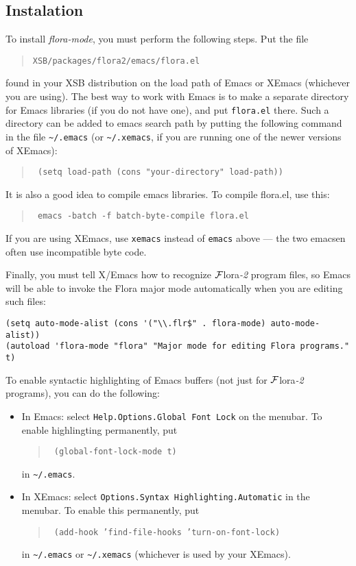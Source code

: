 \documentclass[11pt]{article}
\newcommand{\FLORA}{{\mbox{${\cal F}${\sc lora}\rm\emph{-2}}}\xspace}
\begin{document}
\subsection{Instalation}


To install \emph{flora-mode}, you must perform the following steps. Put the
file
\begin{quote}
  {\tt XSB/packages/flora2/emacs/flora.el} 
\end{quote}
found in your XSB distribution on the load path of Emacs or XEmacs
(whichever you are using). The best way to work with Emacs is to make a
separate directory for Emacs libraries (if you do not have one), and put
{\tt flora.el} there. Such a directory can be added to emacs search path by
putting the following command in the file \verb|~/.emacs| (or
\verb|~/.xemacs|, if you are running one of the newer versions of XEmacs):
\begin{quote}
  \tt
   (setq load-path (cons "your-directory" load-path)) 
\end{quote}
It is also a good idea to compile emacs libraries. To compile flora.el,
use this:
\begin{quote}
  \tt
   emacs -batch -f batch-byte-compile flora.el 
\end{quote}
If you are using XEmacs, use {\tt xemacs} instead of {\tt emacs} above ---
the two emacsen often use incompatible byte code.

Finally, you must tell X/Emacs how to recognize \FLORA program files, so
Emacs will be able to invoke the Flora major mode automatically when you
are editing such files:
\begin{verbatim}
(setq auto-mode-alist (cons '("\\.flr$" . flora-mode) auto-mode-alist))
(autoload 'flora-mode "flora" "Major mode for editing Flora programs." t)
\end{verbatim}

To enable syntactic highlighting of Emacs buffers (not just for \FLORA
programs), you can do the following:
\begin{itemize}
  \item  {\sf In Emacs:} select {\tt Help.Options.Global Font Lock} on
    the menubar.  To enable highlingting permanently, put 
    \begin{quote}
      \tt
      (global-font-lock-mode t)
    \end{quote}
    in \verb|~/.emacs|.
  \item {\sf In XEmacs:} select {\tt Options.Syntax
        Highlighting.Automatic} in the menubar. To enable this permanently, put
      \begin{quote}
        \tt
        (add-hook 'find-file-hooks 'turn-on-font-lock)
      \end{quote}
      in \verb|~/.emacs| or \verb|~/.xemacs| (whichever is used by your
      XEmacs).
\end{itemize}
\end{document}
